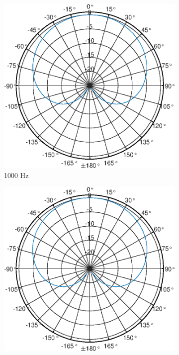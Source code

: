 \begin{figure}[b]
    \centering
    \begin{subfigure}{.33\textwidth}
        \centering
        \includegraphics[width=0.95\linewidth]{Figures/KM184_1000Hz}
        \caption{1000 Hz}
        \label{fig:Polar_1000}
    \end{subfigure}%
    \begin{subfigure}{.33\textwidth}
        \centering
        \includegraphics[width=0.95\linewidth]{Figures/KM184_2000Hz}

\end{subfigure}
\end{figure}
